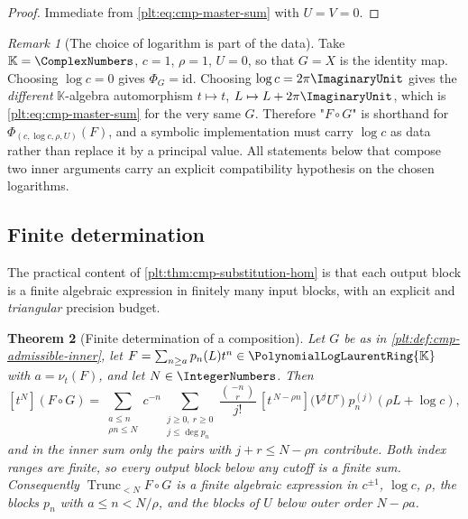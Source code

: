 \documentclass[11pt,oneside]{article}
\theoremstyle{plain}
\newtheorem{theorem}{Theorem}[section]
\theoremstyle{definition}
\theoremstyle{remark}
\newtheorem{remark}[theorem]{Remark}
\newcommand{\K}{\mathbb{K}}
\newcommand{\PLlau}{\PolynomialLogLaurentRing{\K}}       %
\newcommand{\ordt}{\nu_{t}}                              %
\newcommand{\Trunc}[2]{\operatorname{Trunc}_{<#2}#1}     %
\newcommand{\compose}{\mathbin{\circ}}
\begin{document}
\begin{proof}
Immediate from \eqref{plt:eq:cmp-master-sum} with \(U=V=0\).
\end{proof}

\begin{remark}[The choice of logarithm is part of the data]
\label{plt:rmk:cmp-branch-matters}
Take \(\K=\ComplexNumbers\), \(c=1\), \(\rho=1\), \(U=0\), so that
\(G=X\) is the identity map.  Choosing \(\log c=0\) gives
\(\Phi_G=\mathrm{id}\).  Choosing \(\log c=2\pi\ImaginaryUnit\) gives the
\emph{different} \(\K\)-algebra automorphism
\(t\mapsto t\), \(L\mapsto L+2\pi\ImaginaryUnit\), which is
\eqref{plt:eq:cmp-master-sum} for the very same \(G\).  Therefore
"\(F\compose G\)" is shorthand for \(\Phi_{(c,\log c,\rho,U)}(F)\), and a
symbolic implementation must carry \(\log c\) as data rather than replace it
by a principal value.  All statements below that compose two inner arguments
carry an explicit compatibility hypothesis on the chosen logarithms.
\end{remark}

\subsection{Finite determination}
\label{plt:sec:cmp-finite-determination}

The practical content of \cref{plt:thm:cmp-substitution-hom} is that each
output block is a finite algebraic expression in finitely many input blocks,
with an explicit and \emph{triangular} precision budget.

\begin{theorem}[Finite determination of a composition]
\label{plt:thm:cmp-finite-determination}
Let \(G\) be as in \cref{plt:def:cmp-admissible-inner}, let
\(F=\sum_{n\ge a}p_n(L)t^n\in\PLlau\) with \(a=\ordt(F)\), and let
\(N\in\IntegerNumbers\).  Then
\begin{equation}\label{plt:eq:cmp-block-finite}
 [t^{N}](F\compose G)
 =\sum_{\substack{a\le n\\ \rho n\le N}}
   c^{-n}\!\!\!
   \sum_{\substack{j\ge0,\ r\ge0\\ j\le\deg p_n}}\!\!\!
   \frac{\binom{-n}{r}}{j!}\,
   [t^{\,N-\rho n}]\bigl(V^{j}U^{r}\bigr)\;
   p_n^{(j)}(\rho L+\log c),
\end{equation}
and in the inner sum only the pairs with \(j+r\le N-\rho n\) contribute.  Both
index ranges are finite, so every output block below any cutoff is a finite
sum.  Consequently
\(\Trunc{F\compose G}{N}\) is a finite algebraic expression in
\(c^{\pm1}\), \(\log c\), \(\rho\), the blocks \(p_n\) with \(a\le n<N/\rho\),
and the blocks of \(U\) below outer order \(N-\rho a\).
\end{theorem}
\end{document}
